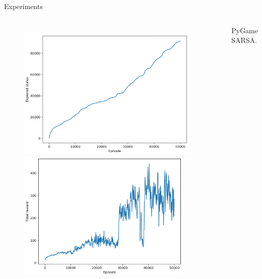 \begin{frame}{Experiments}
    \begin{columns}[c,onlytextwidth]
            \begin{figure}
                \centering
                \includegraphics[width=0.94\textwidth]{images/pygame-explored-states.png}
                \includegraphics[width=0.9\textwidth]{images/pygame-total-reward.png}
            \end{figure}
            PyGame SARSA.
    \end{columns}
\end{frame}

